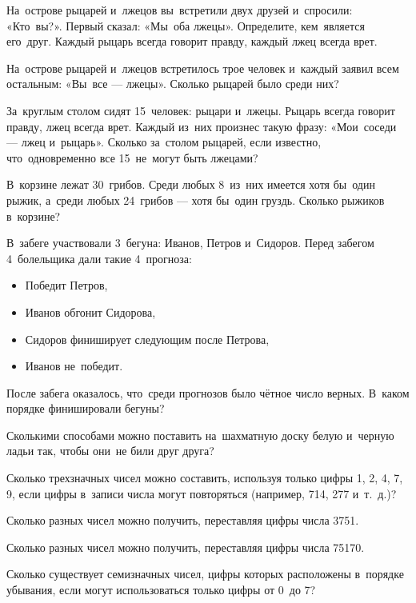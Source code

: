 На~острове рыцарей и~лжецов вы~встретили двух друзей и~спросили: «Кто~вы?». Первый сказал: «Мы~оба лжецы». 
Определите, кем~является его~друг. Каждый рыцарь всегда говорит правду, каждый лжец всегда врет.

На~острове рыцарей и~лжецов встретилось трое человек и~каждый заявил всем остальным: «Вы~все — лжецы». 
Сколько рыцарей было среди них?

За~круглым столом сидят 15~человек: рыцари и~лжецы. Рыцарь всегда говорит правду, лжец всегда врет. 
Каждый из~них произнес такую фразу: «Мои~соседи — лжец и~рыцарь». 
Сколько за~столом рыцарей, если известно, что~одновременно все 15~не~могут быть лжецами?

В~корзине лежат 30~грибов. Среди любых 8~из~них имеется хотя бы~один рыжик, 
а~среди любых 24~грибов — хотя бы~один груздь. Сколько рыжиков в~корзине? 

В~забеге участвовали 3~бегуна: Иванов, Петров и~Сидоров. Перед забегом 4~болельщика дали такие 4~прогноза: 
\begin{itemize}
    \item Победит Петров,
    \item Иванов обгонит Сидорова,
    \item Сидоров финиширует следующим после Петрова,
    \item Иванов не~победит.  
\end{itemize}
После забега оказалось, что~среди прогнозов было чётное число верных. В~каком порядке финишировали бегуны? 

Сколькими способами можно поставить на~шахматную доску белую и~черную ладьи так, чтобы они~не били друг друга? 

Сколько трехзначных чисел можно составить, используя только цифры 1, 2, 4, 7, 9, 
если цифры в~записи числа могут повторяться (например, 714, 277 и~т.~д.)?

Сколько разных чисел можно получить, переставляя цифры числа 3751. 

Сколько разных чисел можно получить, переставляя цифры числа 75170. 

Сколько существует семизначных чисел, цифры которых расположены в~порядке убывания, 
если могут использоваться только цифры от 0~до 7? 

